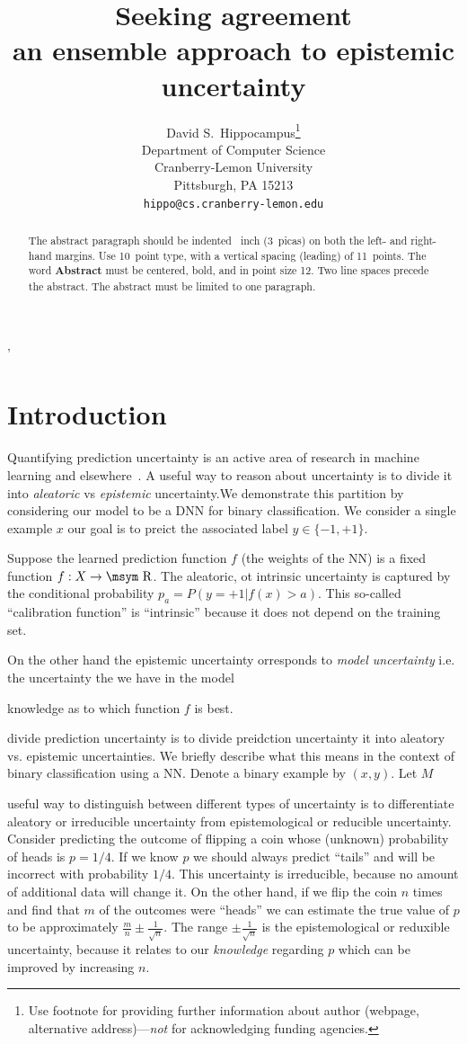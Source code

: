 \documentclass{article}
\title{Seeking agreement\\ {\large an ensemble approach to epistemic uncertainty} }
\author{%
  David S.~Hippocampus\thanks{Use footnote for providing further information
    about author (webpage, alternative address)---\emph{not} for acknowledging
    funding agencies.} \\
  Department of Computer Science\\
  Cranberry-Lemon University\\
  Pittsburgh, PA 15213 \\
  \texttt{hippo@cs.cranberry-lemon.edu} \\
}
\newcommand{\reals}{\mbox{\msym R}}
\begin{document}
\nolinenumbers'

\maketitle


\begin{abstract}
  The abstract paragraph should be indented ~inch (3~picas) on
  both the left- and right-hand margins. Use 10~point type, with a vertical
  spacing (leading) of 11~points.  The word \textbf{Abstract} must be centered,
  bold, and in point size 12. Two line spaces precede the abstract. The abstract
  must be limited to one paragraph.
\end{abstract}


\section{Introduction}
Quantifying prediction uncertainty is an active area of research in
machine learning and
elsewhere~\cite{breiman1993fitting,li2008knows,hora1996aleatory,mc-dropout,der2009aleatory,hullermeier2019aleatoric}. A
useful way to reason about uncertainty is to divide it into {\em
  aleatoric} vs {\em epistemic} uncertainty.We demonstrate this
partition by considering our model to be a DNN for binary
classification.  We consider a single example $x$ our goal is to
preict the associated label $y \in \{-1,+1\}$.


Suppose the learned
prediction function $f$ (the weights of the NN) is a fixed function
$f: X \to \reals$. The aleatoric, ot intrinsic uncertainty is captured
by the conditional probability $p_a=P(y=+1|f(x)>a)$. This so-called
``calibration function'' is ``intrinsic'' because it does not depend
on the training set.

On the other hand the epistemic uncertainty orresponds to {\em model uncertainty} i.e. the uncertainty the we have in the model



knowledge as to which function $f$ is best. 


divide prediction uncertainty is to divide preidction uncertainty it into
aleatory vs. epistemic uncertainties. We briefly describe what this
means in the context of binary classification using a NN. Denote a
binary example by $(x,y)$. Let $M$ 





useful way to distinguish between different types of uncertainty is to
differentiate aleatory or irreducible uncertainty from epistemological
or reducible uncertainty. Consider predicting the outcome of flipping
a coin whose (unknown) probability of heads is $p=1/4$. If we know $p$
we should always predict ``tails'' and will be incorrect with
probability $1/4$. This uncertainty is irreducible, because no amount
of additional data will change it. On the other hand, if we flip the
coin $n$ times and find that $m$ of the outcomes were ``heads'' we can
estimate the true value of $p$ to be approximately
$\frac{m}{n} \pm \frac{1}{\sqrt{n}}$. The range
$\pm \frac{1}{\sqrt{n}}$ is the epistemological or reduxible
uncertainty, because it relates to our {\em knowledge} regarding $p$
which can be improved by increasing $n$.
\end{document}
